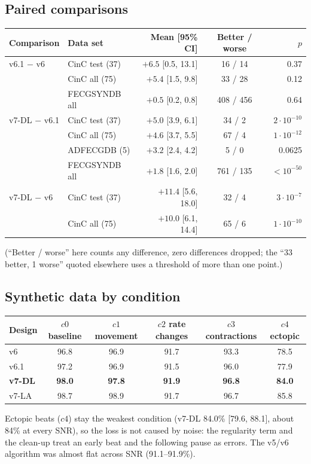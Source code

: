 \documentclass[11pt]{article}
\begin{document}
\subsection{Paired comparisons}
\begin{center}
\small
\begin{tabular}{@{}llrcr@{}}
\toprule
\textbf{Comparison} & \textbf{Data set} & \textbf{Mean [95\% CI]} & \textbf{Better / worse} & \textbf{$p$} \\
\midrule
v6.1 $-$ v6 & CinC test (37) & $+6.5$ [0.5, 13.1] & 16 / 14 & 0.37 \\
 & CinC all (75) & $+5.4$ [1.5, 9.8] & 33 / 28 & 0.12 \\
 & FECGSYNDB all & $+0.5$ [0.2, 0.8] & 408 / 456 & 0.64 \\
\midrule
v7-DL $-$ v6.1 & CinC test (37) & $+5.0$ [3.9, 6.1] & 34 / 2 & $2\cdot10^{-10}$ \\
 & CinC all (75) & $+4.6$ [3.7, 5.5] & 67 / 4 & $1\cdot10^{-12}$ \\
 & ADFECGDB (5) & $+3.2$ [2.4, 4.2] & 5 / 0 & 0.0625 \\
 & FECGSYNDB all & $+1.8$ [1.6, 2.0] & 761 / 135 & $<10^{-50}$ \\
\midrule
v7-DL $-$ v6 & CinC test (37) & $+11.4$ [5.6, 18.0] & 32 / 4 & $3\cdot10^{-7}$ \\
 & CinC all (75) & $+10.0$ [6.1, 14.4] & 65 / 6 & $1\cdot10^{-10}$ \\
\bottomrule
\end{tabular}
\end{center}
(``Better / worse'' here counts any difference, zero differences dropped; the ``33 better, 1 worse'' quoted elsewhere uses a threshold of more than one point.)

\subsection{Synthetic data by condition}
\begin{center}
\small
\begin{tabular}{@{}lccccc@{}}
\toprule
\textbf{Design} & \textbf{$c0$ baseline} & \textbf{$c1$ movement} & \textbf{$c2$ rate changes} & \textbf{$c3$ contractions} & \textbf{$c4$ ectopic} \\
\midrule
v6 & 96.8 & 96.9 & 91.7 & 93.3 & 78.5 \\
v6.1 & 97.2 & 96.9 & 91.5 & 96.0 & 77.9 \\
\textbf{v7-DL} & \textbf{98.0} & \textbf{97.8} & \textbf{91.9} & \textbf{96.8} & \textbf{84.0} \\
v7-LA & 98.7 & 98.9 & 91.7 & 96.7 & 85.8 \\
\bottomrule
\end{tabular}
\end{center}
Ectopic beats ($c4$) stay the weakest condition (v7-DL 84.0\% [79.6, 88.1], about 84\% at every SNR), so the loss is not caused by noise: the regularity term and the clean-up treat an early beat and the following pause as errors. The v5/v6 algorithm was almost flat across SNR (91.1--91.9\%).
\end{document}
